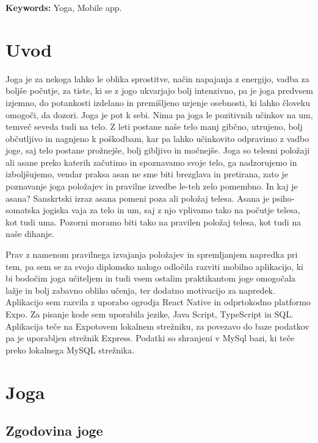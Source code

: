 \documentclass[a4paper, 12pt]{book}
\newcommand{\tkeywordsEn}{Yoga, Mobile app}
\newcommand{\clearemptydoublepage}{\newpage{\pagestyle{empty}\cleardoublepage}}
\begin{document}
\noindent\textbf{Keywords:} \tkeywordsEn.
\clearemptydoublepage

\mainmatter
\setcounter{page}{1}
\pagestyle{fancy}

\chapter{Uvod}
Joga je za nekoga lahko le oblika sprostitve, način napajanja z energijo, vadba za boljše počutje, za tiste, ki se z jogo ukvarjajo bolj intenzivno, pa je joga predvsem izjemno, do potankosti izdelano in premišljeno urjenje osebnosti, ki lahko človeku omogoči, da dozori. Joga je pot k sebi. Nima pa joga le pozitivnih učinkov na um, temveč seveda tudi na telo. 
Z leti postane naše telo manj gibčno, utrujeno, bolj občutljivo in nagnjeno k poškodbam, kar pa lahko učinkovito odpravimo z vadbo joge, saj telo postane prožnejše, bolj gibljivo in močnejše. Joga so telesni položaji ali asane preko katerih začutimo in spoznavamo svoje telo, ga nadzorujemo in izboljšujemo, vendar praksa asan ne sme biti brezglava in pretirana, zato je poznavanje joga položajev in pravilne izvedbe le-teh zelo pomembno. 
In kaj je asana? Sanskrtski izraz asana pomeni poza ali položaj telesa. Asana je psiho-somatska jogiska vaja za telo in um, saj z njo vplivamo tako na počutje telesa, kot tudi uma. Pozorni moramo biti tako na pravilen položaj telesa, kot tudi na naše dihanje. 

Prav z namenom pravilnega izvajanja položajev in spremljanjem napredka pri tem, pa sem se za svojo diplomsko nalogo odločila razviti mobilno aplikacijo, ki bi bodočim joga učiteljem in tudi vsem ostalim praktikantom joge omogočala lažje in bolj zabavno obliko učenja, ter dodatno motivacijo za napredek. Aplikacijo sem razvila z uporabo ogrodja React Native in odprtokodno platformo Expo. Za pisanje kode sem uporabila jezike, Java Script, TypeScript in SQL. Aplikacija teče na Expotovem lokalnem strežniku, za povezavo do baze podatkov pa je uporabljen strežnik Express. Podatki so shranjeni v MySql bazi, ki teče preko lokalnega MySQL strežnika.

\chapter{Joga}
\label{ch0}

\section{Zgodovina joge}
\end{document}
